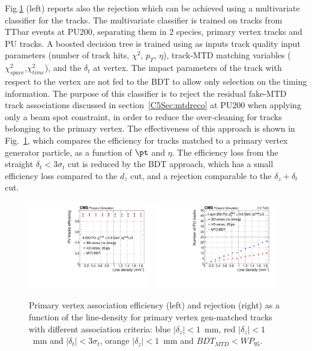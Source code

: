 Fig.\ref{fig:purej_bdt} (left) reports also the rejection which can be achieved using a multivariate classifier for the tracks. The multivariate classifier is trained on tracks from TTbar events at PU200, separating them in 2 species, primary vertex tracks and PU tracks. A boosted decision tree is trained using as inputs track quality input parameters (number of track hits, $\chi^2$, $p_{T}$, $\eta$), track-MTD matching variables ($\chi^2_{space}$,$\chi^2_{time}$), and the $\delta_{t}$ at vertex. The impact parameters of the track with respect to the vertex are not fed to the BDT to allow only selection on the timing information. The purpose of this classifier is to reject the residual fake-MTD track associations discussed in section~\ref{C5Sec:mtdreco} at PU200 when applying only a beam spot constraint, in order to reduce the over-cleaning for tracks belonging to the primary vertex. The effectiveness of this approach is shown in Fig.~\ref{fig:purej_bdt}, which compares the efficiency for tracks matched to a primary vertex generator particle, as a function of $\pt$ and $\eta$. The efficiency loss from the straight $\delta_{t}<3\sigma_{t}$ cut is reduced by the BDT approach, which has a small efficiency loss compared to the $d_{z}$ cut, and a rejection comparable to the $\delta_{z}+\delta_{t}$ cut. 

\begin{figure}[!phtb]
\centering
\includegraphics[width=0.48\textwidth]{fig/performance/purej/BDT_noTrackInfo/track_eff_vs_linden_ttbar.pdf}
\includegraphics[width=0.48\textwidth]{fig/performance/purej/BDT_noTrackInfo/track_pu_vs_linden_nugun.pdf}
 \caption{Primary vertex association efficiency (left) and rejection (right) as a function of the line-density for primary vertex gen-matched tracks with different association criteria: blue $|\delta_{z}|<1$~mm,  red $|\delta_{z}|<1$~mm and $|\delta_{t}|<3\sigma_{t}$, orange $|\delta_{z}|<1$~mm and $BDT_{MTD}<WP_{95}$.  }
   \label{fig:purej_bdt}
\end{figure}

